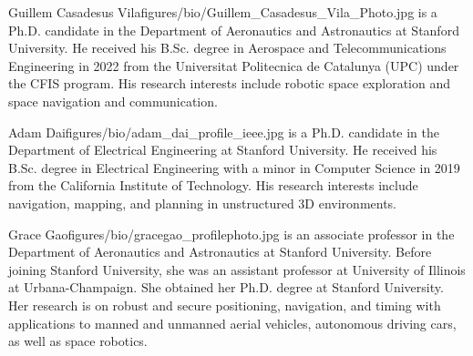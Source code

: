 \thebiography

\begin{biographywithpic}
	{Guillem Casadesus Vila}{figures/bio/Guillem_Casadesus_Vila_Photo.jpg}
	is a Ph.D. candidate in the Department of Aeronautics and Astronautics at Stanford University. He received his B.Sc. degree in Aerospace and Telecommunications Engineering in 2022 from the Universitat Politecnica de Catalunya (UPC) under the CFIS program. His research interests include robotic space exploration and space navigation and communication.
\end{biographywithpic}

\begin{biographywithpic}
	{Adam Dai}{figures/bio/adam_dai_profile_ieee.jpg}
	is a Ph.D. candidate in the Department of Electrical Engineering at Stanford University. He received his B.Sc. degree in Electrical Engineering with a minor in Computer Science in 2019 from the California Institute of Technology. His research interests include navigation, mapping, and planning in unstructured 3D environments.
\end{biographywithpic}

\begin{biographywithpic}
	{Grace Gao}{figures/bio/gracegao_profilephoto.jpg}
	is an associate professor in the Department of Aeronautics and Astronautics at Stanford University.
	Before joining Stanford University, she was an assistant professor at University of Illinois at Urbana-Champaign.
	She obtained her Ph.D. degree at Stanford University.
	Her research is on robust and secure positioning, navigation, and timing with applications to manned and unmanned aerial vehicles, autonomous driving cars, as well as space robotics.
\end{biographywithpic}
\vfill
